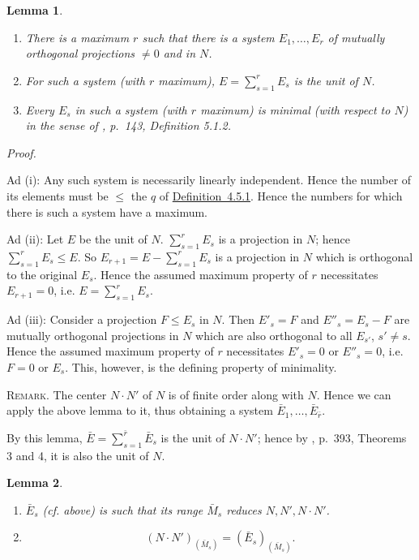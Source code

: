 \documentclass[b5paper,twoside]{article}
\newcommand{\defref}[2]{\hyperref[#1]{\mbox{Definition~#2}}}
\theoremstyle{mvnplain}
\newtheorem{lemma}{Lemma}[section]
\renewenvironment{proof}[1][Proof]{%
  \par\addvspace{0.35\baselineskip}%
  \noindent\textit{#1.}\ \normalfont\ignorespaces
}{%
  \par\addvspace{0.35\baselineskip}%
}
\newcommand{\N}{\mathbf N}
\def\N{N}%
\def\mathfrak#1{#1}%
\begin{document}
\begin{lemma}\label{lem:4.5.2}
\begin{enumerate}[label=(\roman*)]
\item There is a maximum \(r\) such that there is a system
\(E_1,\ldots,E_r\) of mutually orthogonal projections \(\ne0\) and in \(\N\).
\item For such a system (with \(r\) maximum),
\(E=\sum_{s=1}^{r}E_s\) is the unit of \(\N\).
\item Every \(E_s\) in such a system (with \(r\) maximum) is minimal (with
respect to \(\N\)) in the sense of \cite{ref5}, p.~143,
Definition 5.1.2.
\end{enumerate}
\end{lemma}

\begin{proof}
Ad (i): Any such system is necessarily linearly independent. Hence the number
of its elements must be \(\leq\) the \(q\) of \defref{def:4.5.1}{4.5.1}.
Hence the numbers for which there is such a system have a maximum.

Ad (ii): Let \(E\) be the unit of \(\N\). \(\sum_{s=1}^{r}E_s\) is a
projection in \(\N\); hence \(\sum_{s=1}^{r}E_s\leq E\). So
\(E_{r+1}=E-\sum_{s=1}^{r}E_s\) is a projection in \(\N\) which is
orthogonal to the original \(E_s\). Hence the assumed maximum property of
\(r\) necessitates \(E_{r+1}=0\), i.e. \(E=\sum_{s=1}^{r}E_s\).

Ad (iii): Consider a projection \(F\leq E_s\) in \(\N\). Then
\(E'_s=F\) and \(E''_s=E_s-F\) are mutually orthogonal projections in
\(\N\) which are also orthogonal to all \(E_{s'}\), \(s'\ne s\). Hence the
assumed maximum property of \(r\) necessitates \(E'_s=0\) or
\(E''_s=0\), i.e. \(F=0\) or \(E_s\). This, however, is the defining
property of minimality.
\end{proof}

\noindent\textsc{Remark.} The center \(\N\mathbin{\cdot}\N'\) of \(\N\)
is of finite order along with \(\N\). Hence we can apply the above lemma to it,
thus obtaining a system \(\bar E_1,\ldots,\bar E_{\bar r}\).

By this lemma, \(\bar E=\sum_{s=1}^{\bar r}\bar E_s\) is the unit of
\(\N\mathbin{\cdot}\N'\); hence by \cite{ref2}, p.~393,
Theorems 3 and 4, it is also the unit of \(\N\).

\begin{lemma}\label{lem:4.5.3}
\begin{enumerate}[label=(\roman*)]
\item \(\bar E_s\) (cf. above) is such that its range \(\bar{\mathfrak M}_s\)
reduces \(\N,\N',\N\mathbin{\cdot}\N'\).
\item
\[
 (\N\mathbin{\cdot}\N')_{(\bar{\mathfrak M}_s)}
   =(\bar E_s)_{(\bar{\mathfrak M}_s)}.
\]
\end{enumerate}
\end{lemma}
\end{document}
